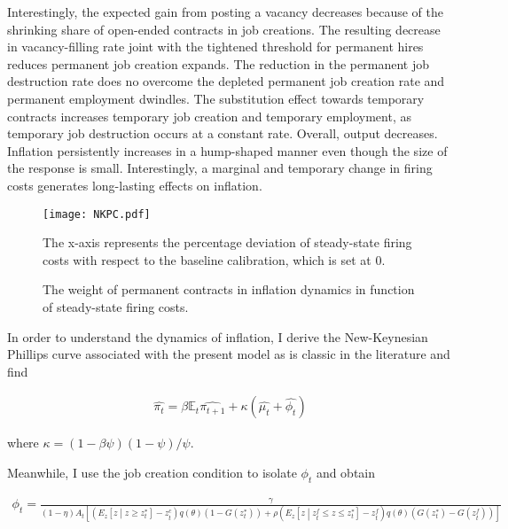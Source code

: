 Interestingly, the expected gain from posting a vacancy decreases because of the shrinking share of open-ended contracts in job creations. The resulting decrease in vacancy-filling rate joint with the tightened threshold for permanent hires reduces permanent job creation expands. The reduction in the permanent job destruction rate does no overcome the depleted permanent job creation rate and permanent employment dwindles. The substitution effect towards temporary contracts increases temporary job creation and temporary employment, as temporary job destruction occurs at a constant rate. Overall, output decreases. Inflation persistently increases in a hump-shaped manner even though the size of the response is small. Interestingly, a marginal and temporary change in firing costs generates long-lasting effects on inflation.

\begin{figure}[t]
\texttt{[image: NKPC.pdf]}
\caption{The weight of permanent contracts in inflation dynamics in function of steady-state firing costs.}
\label{NKPC}
\footnotesize
\begin{flushleft}
The x-axis represents the percentage deviation of steady-state firing costs with respect to the baseline calibration, which is set at 0.
\end{flushleft}
\end{figure}


In order to understand the dynamics of inflation, I derive the New-Keynesian Phillips curve associated with the present model as is classic in the literature and find

\begin{align*}
\widehat{\pi_t} = \beta \mathbb{E}_t \widehat{\pi_{t+1}} + \kappa \left( \widehat{\mu_t} + \widehat{\phi_t} \right)
\end{align*}

where $\kappa = (1-\beta \psi) (1-\psi) / \psi$.

Meanwhile, I use the job creation condition to isolate $\phi_t$ and obtain

\begin{align*}
\phi_t = \frac{\gamma}{ (1-\eta) A_t \left[ \left( E_z \left[ z \middle| z \geq z_t^* \right] - z_t^c \right) q\left( \theta \right) \left( 1 - G\left( z_t^* \right)\right) + \rho \left( E_z \left[ z \middle| z_t^f \leq z \leq z_t^* \right] - z_t^f \right) q\left( \theta \right) \left( G\left( z_t^* \right) - G\left( z_t^f \right)\right) \right] }
\end{align*}  

